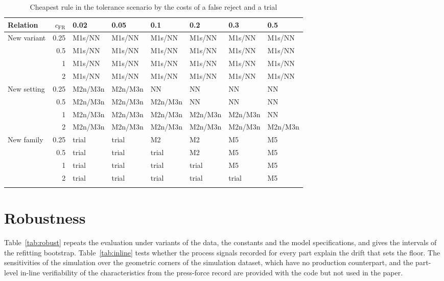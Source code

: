\documentclass[pdflatex,sn-basic]{sn-jnl}
\newcommand{\tabsize}{\fontsize{8}{9.5}\selectfont}
\begin{document}
\begin{table}[tbp]
\tabsize
\setlength{\tabcolsep}{4pt}
\caption{Cheapest rule in the tolerance scenario by the costs of a false reject and a trial}\label{tab:costmap}
\begin{tabular}{@{}lrllllll@{}}
\toprule
Relation & $c_\mathrm{FR}$ & 0.02 & 0.05 & 0.1 & 0.2 & 0.3 & 0.5 \\
\midrule
New variant & 0.25 & M1s/NN & M1s/NN & M1s/NN & M1s/NN & M1s/NN & M1s/NN \\
 & 0.5 & M1s/NN & M1s/NN & M1s/NN & M1s/NN & M1s/NN & M1s/NN \\
 & 1 & M1s/NN & M1s/NN & M1s/NN & M1s/NN & M1s/NN & M1s/NN \\
 & 2 & M1s/NN & M1s/NN & M1s/NN & M1s/NN & M1s/NN & M1s/NN \\
New setting & 0.25 & M2n/M3n & M2n/M3n & NN & NN & NN & NN \\
 & 0.5 & M2n/M3n & M2n/M3n & M2n/M3n & NN & NN & NN \\
 & 1 & M2n/M3n & M2n/M3n & M2n/M3n & M2n/M3n & M2n/M3n & NN \\
 & 2 & M2n/M3n & M2n/M3n & M2n/M3n & M2n/M3n & M2n/M3n & M2n/M3n \\
New family & 0.25 & trial & trial & M2 & M2 & M5 & M5 \\
 & 0.5 & trial & trial & trial & M2 & M5 & M5 \\
 & 1 & trial & trial & trial & trial & M5 & M5 \\
 & 2 & trial & trial & trial & trial & trial & M5 \\
\botrule
\end{tabular}
\end{table}

\FloatBarrier
\section{Robustness}\label{sec:s-robust}

Table~\ref{tab:robust} repeats the evaluation under variants of the data, the constants and the model specifications, and gives the intervals of the refitting bootstrap. Table~\ref{tab:inline} tests whether the process signals recorded for every part explain the drift that sets the floor. The sensitivities of the simulation over the geometric corners of the simulation dataset, which have no production counterpart, and the part-level in-line verifiability of the characteristics from the press-force record are provided with the code but not used in the paper.
\end{document}
